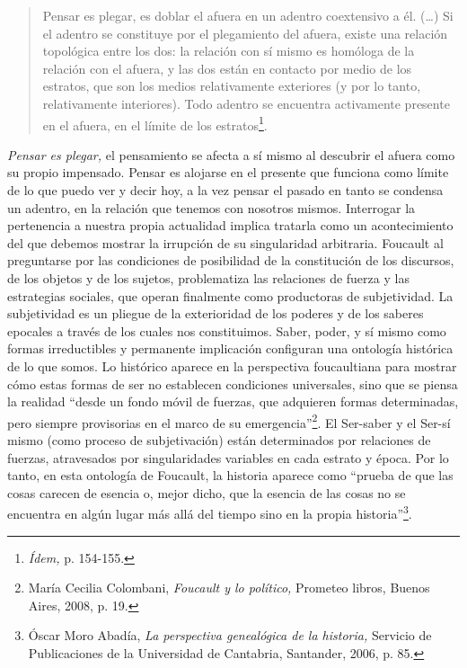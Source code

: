 \begin{quote}
Pensar es plegar, es doblar el afuera en un adentro coextensivo a él. (\dots) Si el adentro se constituye por el plegamiento del afuera, existe una relación topológica entre los dos: la relación con sí mismo es homóloga de la relación con el afuera, y las dos están en contacto por medio de los estratos, que son los medios relativamente exteriores (y por lo tanto, relativamente interiores). Todo adentro se encuentra activamente presente en el afuera, en el límite de los estratos\footnote{\emph{Ídem,} p. 154-155.}.
\end{quote}

\emph{Pensar es plegar,} el pensamiento se afecta a sí mismo al descubrir el afuera como su propio impensado. Pensar es alojarse en el presente que funciona como límite de lo que puedo ver y decir hoy, a la vez pensar el pasado en tanto se condensa un adentro, en la relación que tenemos con nosotros mismos. Interrogar la pertenencia a nuestra propia actualidad implica tratarla como un acontecimiento del que debemos mostrar la irrupción de su singularidad arbitraria. Foucault al preguntarse por las condiciones de posibilidad de la constitución de los discursos, de los objetos y de los sujetos, problematiza las relaciones de fuerza y las estrategias sociales, que operan finalmente como productoras de subjetividad. La subjetividad es un pliegue de la exterioridad de los poderes y de los saberes epocales a través de los cuales nos constituimos. Saber, poder, y sí mismo como formas irreductibles y permanente implicación configuran una ontología histórica de lo que somos. Lo histórico aparece en la perspectiva foucaultiana para mostrar cómo estas formas de ser no establecen condiciones universales, sino que se piensa la realidad \enquote{desde un fondo móvil de fuerzas, que adquieren formas determinadas, pero siempre provisorias en el marco de su emergencia}\footnote{María Cecilia Colombani, \emph{Foucault y lo político,} Prometeo libros, Buenos Aires, 2008, p. 19.}. El Ser-saber y el Ser-sí mismo (como proceso de subjetivación) están determinados por relaciones de fuerzas, atravesados por singularidades variables en cada estrato y época. Por lo tanto, en esta ontología de Foucault, la historia aparece como \enquote{prueba de que las cosas carecen de esencia o, mejor dicho, que la esencia de las cosas no se encuentra en algún lugar más allá del tiempo sino en la propia historia}\footnote{Óscar Moro Abadía, \emph{La perspectiva genealógica de la historia,} Servicio de Publicaciones de la Universidad de Cantabria, Santander, 2006, p. 85.}.

